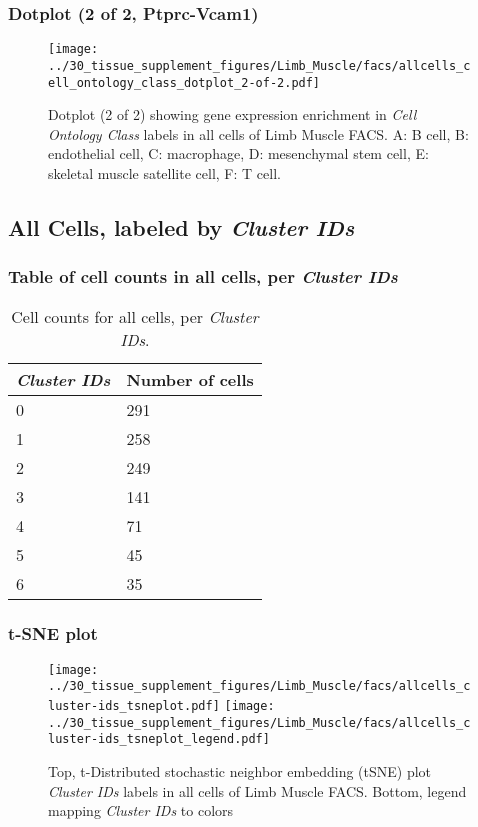 \subsubsection{Dotplot (2 of 2, Ptprc-Vcam1)}
\begin{figure}[h]
\centering
\texttt{[image: ../30\_tissue\_supplement\_figures/Limb\_Muscle/facs/allcells\_cell\_ontology\_class\_dotplot\_2-of-2.pdf]}

\caption{ Dotplot (2 of 2)  showing gene expression enrichment in \emph{Cell Ontology Class} labels in all cells of Limb Muscle FACS. A: B cell, B: endothelial cell, C: macrophage, D: mesenchymal stem cell, E: skeletal muscle satellite cell, F: T cell.}
\end{figure}


\clearpage

\subsection{All Cells, labeled by \emph{Cluster IDs}}
\subsubsection{Table of cell counts in all cells, per \emph{Cluster IDs}}\begin{table}[h]
\centering
\label{my-label}
\begin{tabular}{@{}ll@{}}
\toprule

\emph{Cluster IDs}& Number of cells \\ \midrule
0 & 291 \\

1 & 258 \\

2 & 249 \\

3 & 141 \\

4 & 71 \\

5 & 45 \\

6 & 35 \\
\bottomrule
\end{tabular}
\caption{Cell counts for all cells, per \emph{Cluster IDs}.}
\end{table}

\clearpage
\subsubsection{t-SNE plot}
\begin{figure}[h]
\centering
\texttt{[image: ../30\_tissue\_supplement\_figures/Limb\_Muscle/facs/allcells\_cluster-ids\_tsneplot.pdf]}
\texttt{[image: ../30\_tissue\_supplement\_figures/Limb\_Muscle/facs/allcells\_cluster-ids\_tsneplot\_legend.pdf]}
\caption{Top, t-Distributed stochastic neighbor embedding (tSNE) plot  \emph{Cluster IDs} labels in all cells of Limb Muscle FACS. Bottom, legend mapping \emph{Cluster IDs} to colors}
\end{figure}


